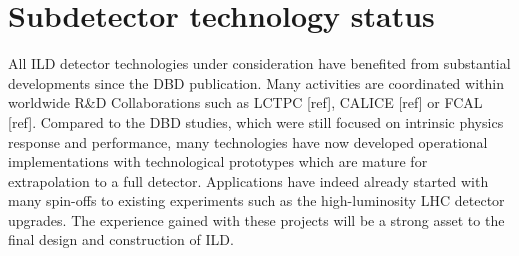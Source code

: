 \newpage
\section{Subdetector technology status}


All ILD detector technologies under consideration have benefited from substantial developments since the DBD publication. Many activities are coordinated within worldwide R\&D Collaborations such as LCTPC [ref], CALICE [ref] or FCAL [ref]. Compared to the DBD studies, which were still focused on intrinsic physics response and performance, many technologies have now developed operational implementations with technological prototypes which are mature for extrapolation to a full detector. Applications have indeed already started with many spin-offs to existing experiments such as the high-luminosity LHC detector upgrades. The experience gained with these projects will be a strong asset to the final design and construction of ILD.  








